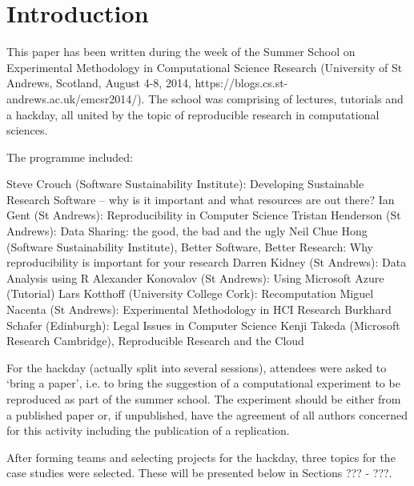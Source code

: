 \section{Introduction}
\label{s:intro}

This paper has been written during the week of the Summer School
on Experimental Methodology in Computational Science Research
(University of St Andrews, Scotland, August 4-8, 2014,
https://blogs.cs.st-andrews.ac.uk/emcsr2014/). The 
school was comprising of lectures, tutorials and a hackday,
all united by the topic of reproducible research in computational
sciences. 

The programme included:

    Steve Crouch (Software Sustainability Institute): Developing Sustainable Research Software – why is it important and what resources are out there?
    Ian Gent (St Andrews): Reproducibility in Computer Science
    Tristan Henderson (St Andrews): Data Sharing: the good, the bad and the ugly
    Neil Chue Hong (Software Sustainability Institute), Better Software, Better Research: Why reproducibility is important for your research
    Darren Kidney (St Andrews): Data Analysis using R
    Alexander Konovalov (St Andrews): Using Microsoft Azure (Tutorial)
    Lars Kotthoff (University College Cork): Recomputation
    Miguel Nacenta (St Andrews): Experimental Methodology in HCI Research
    Burkhard Schafer (Edinburgh): Legal Issues in Computer Science
    Kenji Takeda (Microsoft Research Cambridge), Reproducible Research and the Cloud

For the hackday (actually split into several sessions), attendees 
were asked to `bring a paper', i.e. to bring the suggestion of a 
computational experiment to be reproduced as part of the summer school. 
The experiment should be either from a published paper or, if unpublished, 
have the agreement of all authors concerned for this activity including 
the publication of a replication. 

After forming teams and selecting projects for the hackday, three
topics for the case studies were selected. These will be presented below
in Sections ??? - ???. 



